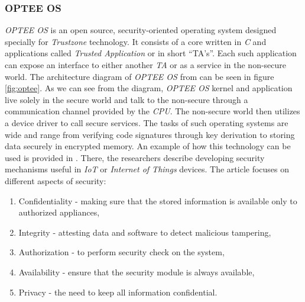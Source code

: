 \subsubsection{OPTEE OS}
\textit{OPTEE OS} is an open source, security-oriented operating system designed specially for \textit{Trustzone} technology. It consists of a core written in \textit{C} and applications called \textit{Trusted Application} or in short “TA's”. Each such application can expose an interface to either another \textit{TA} or as a service in the non-secure world. The architecture diagram of \textit{OPTEE OS} from \cite{opteeblog} can be seen in figure \ref{fig:optee}. As we can see from the diagram, \textit{OPTEE OS} kernel and application live solely in the secure world and talk to the non-secure through a communication channel provided by the \textit{CPU}. The non-secure world then utilizes a device driver to call secure services. The tasks of such operating systems are wide and range from verifying code signatures through key derivation to storing data securely in encrypted memory. An example of how this technology can be used is provided in \cite{opteeusage}. There, the researchers describe developing security mechanisms useful in \textit{IoT} or \textit{Internet of Things} devices. The article focuses on different aspects of security:
\begin{enumerate}
    \item Confidentiality - making sure that the stored information is available only to authorized appliances, 
    \item Integrity - attesting data and software to detect malicious tampering,
    \item Authorization - to perform security check on the system,
    \item Availability - ensure that the security module is always available,
    \item Privacy - the need to keep all information confidential.
\end{enumerate}

